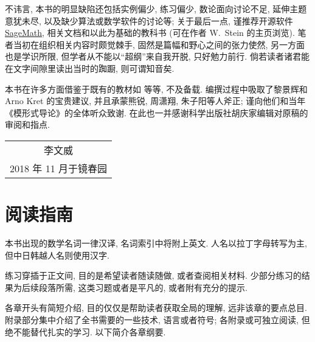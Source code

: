 不讳言, 本书的明显缺陷还包括实例偏少, 练习偏少, 数论面向讨论不足, 延伸主题意犹未尽, 以及缺少算法或数学软件的讨论等; 关于最后一点, 谨推荐开源软件 \href{http://www.sagemath.org}{SageMath}, 相关文档和以此为基础的教科书 \cite{St07} (可在作者 W.\ Stein 的主页浏览). 笔者当初在组织相关内容时颇觉棘手, 固然是篇幅和野心之间的张力使然, 另一方面也是学识所限, 但学者从不能以``超纲''来自我开脱, 只好勉力前行. 倘若读者诸君能在文字间隙里读出当时的踟蹰, 则可谓知音矣.

本书在许多方面借鉴于既有的教材如 \cite{Shi71, Mi89, Bu97, DS05} 等等, 不及备载. 编撰过程中吸取了黎景辉和 Arno Kret 的宝贵建议, 并且承蒙熊锐, 周潇翔, 朱子阳等人斧正; 谨向他们和当年《模形式导论》的全体听众致谢. 在此也一并感谢科学出版社胡庆家编辑对原稿的审阅和指点.

\vspace{0.5em}
\begin{flushright}\begin{minipage}{0.3 \textwidth}
	\begin{tabular}{c}
		{\kaishu 李文威} \\
		2018 年 11 月于镜春园
	\end{tabular}
\end{minipage}\end{flushright}
\vspace{1em}

\section*{阅读指南}
本书出现的数学名词一律汉译, 名词索引中将附上英文. 人名以拉丁字母转写为主, 但中日韩越人名则使用汉字.

练习穿插于正文间, 目的是希望读者随读随做, 或者查阅相关材料. 少部分练习的结果为后续段落所需, 这类习题或者是平凡的, 或者附有充分的提示.

各章开头有简短介绍, 目的仅仅是帮助读者获取全局的理解, 远非该章的要点总目. 附录部分集中介绍了全书需要的一些技术, 语言或者符号; 各附录或可独立阅读, 但绝不能替代扎实的学习. 以下简介各章纲要.

